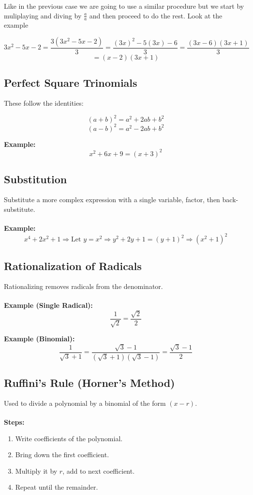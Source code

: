Like in the previous case we are going to use a similar procedure but we start by
muliplaying and diving by \(\frac{a}{a}\) and then proceed to do the rest. Look at the example

\[
3x^2 -5x - 2 = \frac{3(3x^2 -5x - 2)}{3} = \frac{(3x)^2 -5(3x) - 6}{3} = \frac{(3x- 6)(3x+1)}{3} 
\]
\[
= (x- 2)(3x +1)
\]

\subsection{Perfect Square Trinomials}

These follow the identities:

\[
(a + b)^2 = a^2 + 2ab + b^2
\]
\[
(a - b)^2 = a^2 - 2ab + b^2
\]

\textbf{Example:}
\[
x^2 + 6x + 9 = (x + 3)^2
\]

\subsection{Substitution}

Substitute a more complex expression with a single variable, factor, then back-substitute.
\\\\
\textbf{Example:}
\[
x^4 + 2x^2 + 1 \Rightarrow \text{Let } y = x^2 \Rightarrow y^2 + 2y + 1 = (y + 1)^2 \Rightarrow (x^2 + 1)^2
\]

\subsection{Rationalization of Radicals}

Rationalizing removes radicals from the denominator.
\\\\
\textbf{Example (Single Radical):}
\[
\frac{1}{\sqrt{2}} = \frac{\sqrt{2}}{2}
\]

\textbf{Example (Binomial):}
\[
\frac{1}{\sqrt{3} + 1} = \frac{\sqrt{3} - 1}{(\sqrt{3} + 1)(\sqrt{3} - 1)} = \frac{\sqrt{3} - 1}{2}
\]

\subsection{Ruffini’s Rule (Horner’s Method)}

Used to divide a polynomial by a binomial of the form \((x - r)\).
\\\\
\textbf{Steps:}
\begin{enumerate}
    \item Write coefficients of the polynomial.
    \item Bring down the first coefficient.
    \item Multiply it by \(r\), add to next coefficient.
    \item Repeat until the remainder.
\end{enumerate}


